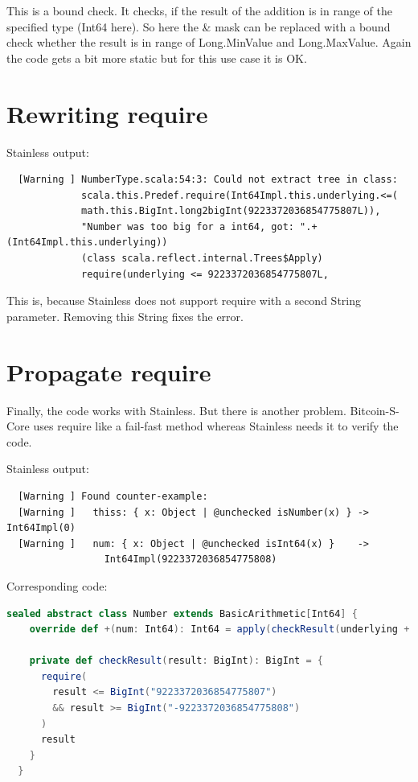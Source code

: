 This is a bound check.
It checks, if the result of the addition is in range of the specified type (Int64 here).
So here the \& mask can be replaced with a bound check whether the result is in range of Long.MinValue and Long.MaxValue.
Again the code gets a bit more static but for this use case it is OK.


\section{Rewriting require}
Stainless output:
\begin{lstlisting}
  [Warning ] NumberType.scala:54:3: Could not extract tree in class:
             scala.this.Predef.require(Int64Impl.this.underlying.<=(
             math.this.BigInt.long2bigInt(9223372036854775807L)),
             "Number was too big for a int64, got: ".+(Int64Impl.this.underlying))
             (class scala.reflect.internal.Trees$Apply)
             require(underlying <= 9223372036854775807L,
\end{lstlisting}

This is, because Stainless does not support require with a second String parameter.
Removing this String fixes the error.

\section{Propagate require}
Finally, the code works with Stainless.
But there is another problem.
Bitcoin-S-Core uses require like a fail-fast method whereas Stainless needs it to verify the code.

Stainless output:
\begin{lstlisting}
  [Warning ] Found counter-example:
  [Warning ]   thiss: { x: Object | @unchecked isNumber(x) } -> Int64Impl(0)
  [Warning ]   num: { x: Object | @unchecked isInt64(x) }    -> 
                 Int64Impl(9223372036854775808)
\end{lstlisting}

Corresponding code:
\begin{lstlisting}[language=scala]
  sealed abstract class Number extends BasicArithmetic[Int64] {
    override def +(num: Int64): Int64 = apply(checkResult(underlying + num.underlying))

    private def checkResult(result: BigInt): BigInt = {
      require(
        result <= BigInt("9223372036854775807")
        && result >= BigInt("-9223372036854775808")
      )
      result
    }
  }
\end{lstlisting}

